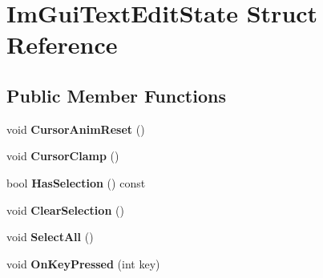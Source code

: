 \hypertarget{struct_im_gui_text_edit_state}{}\section{Im\+Gui\+Text\+Edit\+State Struct Reference}
\label{struct_im_gui_text_edit_state}
\subsection*{Public Member Functions}
\begin{DoxyCompactItemize}
\item 
\mbox{\label{struct_im_gui_text_edit_state_abed49497339d5242f42d86193a2c683e}} 
void {\bfseries Cursor\+Anim\+Reset} ()
\item 
\mbox{\label{struct_im_gui_text_edit_state_ac6f8184c63c826dfc9bc2a47ba57b80c}} 
void {\bfseries Cursor\+Clamp} ()
\item 
\mbox{\label{struct_im_gui_text_edit_state_a46735493114451380c2d3684b528d124}} 
bool {\bfseries Has\+Selection} () const
\item 
\mbox{\label{struct_im_gui_text_edit_state_ae753eb90c3bb7954dfc1e7fd0fef4460}} 
void {\bfseries Clear\+Selection} ()
\item 
\mbox{\label{struct_im_gui_text_edit_state_ab6f494f3335bf7911b83cfc15edd612e}} 
void {\bfseries Select\+All} ()
\item 
\mbox{\label{struct_im_gui_text_edit_state_a30a1d78690ef2bbb9d4b8f75385b8c26}} 
void {\bfseries On\+Key\+Pressed} (int key)
\end{DoxyCompactItemize}
